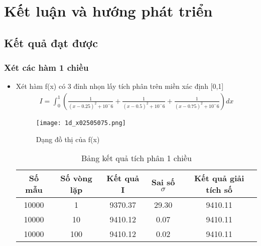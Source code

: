 \chapter{Kết luận và hướng phát triển}\label{ch:4}
\section{Kết quả đạt được}\label{sec:4.1}
\subsection{Xét các hàm 1 chiều}\label{subsec:3.2.1}
\begin{itemize}
    \item Xét hàm f(x) có 3 đỉnh nhọn lấy tích phân trên miền xác định [0,1]
    \begin{align}
        I = \int_{0}^{1}\left(\frac{1}{(x-0.25)^2 +10^-6} +\frac{1}{(x-0.5)^2 +10^-6}+\frac{1}{(x-0.75)^2 +10^-6}\right)dx
    \end{align}
    \begin{figure}[H]
        \centering
        \texttt{[image: 1d\_x02505075.png]}
        \caption{Dạng đồ thị của f(x)}\label{hinh3.2}
    \end{figure}
    \begin{table}[H]
        \centering
        \begin{tabular}{ |c|c|c|c|c| }
         \hline
         \multicolumn{1}{|c}{Số mẫu} & \multicolumn{1}{|c|}{Số vòng lặp} & \multicolumn{1}{|c|}{Kết quả I} & \multicolumn{1}{|c|}{Sai số $\sigma$} & \multicolumn{1}{|c|}{Kết quả giải tích số} \\
         \hline
         10000 & 1  & 9370.37 & 29.30 & 9410.11 \\
         \hline
         10000 & 10  & 9410.12 & 0.07 & 9410.11 \\
         \hline
         10000 & 100  & 9410.12 & 0.02 & 9410.11 \\
         \hline
        \end{tabular}
        \caption{Bảng kết quả tích phân 1 chiều}
        \label{1d_x02505075}
       \end{table}
    

\end{itemize}
